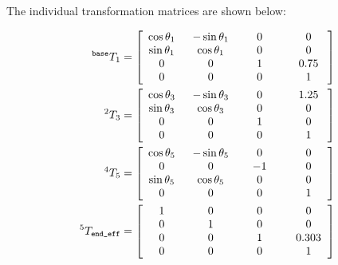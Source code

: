 \documentclass[a4paper]{article}
\newcommand\w[1]{\makebox[3.4em]{$#1$}}
\begin{document}
The individual transformation matrices are shown below:\\
\small
\begin{minipage}[t]{0.45\textwidth}
	\begin{align*}
	^\texttt{base} T_1 &=
	\begin{bmatrix}
	\cos \theta_1 	& -\sin \theta_1 	& 0 	& 0\\
	\sin \theta_1	& \cos \theta_1		& 0		& 0\\
	0				& 0					& 1		& 0.75\\
	\w0				& \w0				& \w0	& \w1\\
	\end{bmatrix}\\
	^2 T_3 &=
	\begin{bmatrix}
	\cos \theta_3 	& -\sin \theta_3 	& 0 	& 1.25\\
	\sin \theta_3	& \cos \theta_3		& 0		& 0\\
	0				& 0					& 1		& 0\\
	\w0				& \w0				& \w0	& \w1
	\end{bmatrix}\\
	^4 T_5 &=
	\begin{bmatrix}
	\cos \theta_5	& -\sin \theta_5	& 0		& 0\\
	0				& 0					& -1	& 0\\
	\sin \theta_5	& \cos \theta_5		& 0		& 0\\
	\w0				& \w0				& \w0	& \w1
	\end{bmatrix}\\
	^5 T_\texttt{end\_eff} &=
	\begin{bmatrix}
	1				& 0					& 0		& 0\\
	0				& 1					& 0		& 0\\
	0				& 0					& \w1		& 0.303\\
	\w0				& \w0				& 0		& \w1
	\end{bmatrix}
	\end{align*}
\end{minipage}
\hspace{0.2cm}
\end{document}
